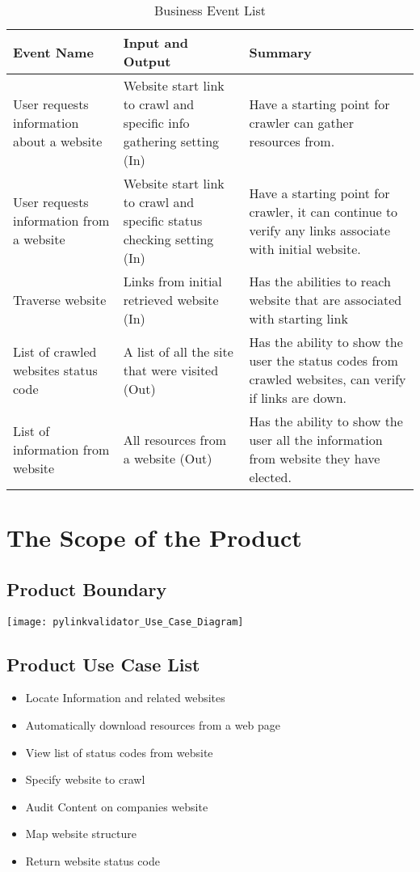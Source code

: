\documentclass[12pt]{article}
\begin{document}
\begin{table}[h!]
    \begin{tabular}{| p{5cm} | p{5cm} | p{5cm} |}    \hline
    Event Name &	Input and Output	 & Summary\\ \hline
    User requests information about a website	& Website start link to crawl and specific info gathering setting (In)	& Have a starting point for crawler can gather resources from. \\ \hline
    User requests information from a website	 & Website start link to crawl and specific status checking setting (In)	& Have a starting point for crawler, it can continue to verify any links associate with initial website.\\ \hline
    Traverse website	& Links from initial retrieved website (In)	& Has the abilities to reach website that are associated with starting link \\ \hline
    
    List of crawled websites status code & 	A list of all the site that were visited (Out)	& Has the ability to show the user the status codes from crawled websites, can verify if links are down. \\ \hline
     
      List of information from website	& All resources from a website (Out)	& Has the ability to show the user all the information from website they have elected. \\ \hline
      
    \end{tabular}
    \caption{Business Event List}
\label{table:Business Event List}
\end{table}


\section{The Scope of the Product }
\subsection{Product Boundary }
\texttt{[image: pylinkvalidator\_Use\_Case\_Diagram]}
\subsection{Product Use Case List  }
\begin{itemize}
  \item Locate Information and related websites
  \item Automatically download resources from a web page
  \item View list of status codes from website 
  \item Specify website to crawl
  \item Audit Content on companies website 
  \item Map website structure
  \item Return website status code
\end{itemize}
\end{document}
